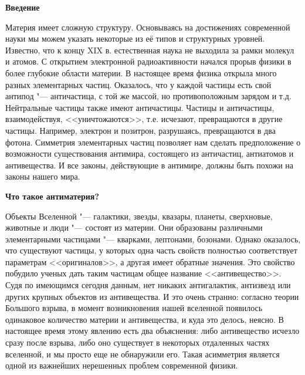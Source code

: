 \begin{flushleft}
    \setlength{\parindent}{14pt}
    \hspace*{10pt}
    \textbf{Введение}
    \vspace*{14pt}

    Материя имеет сложную структуру. Основываясь на достижениях современной науки 
    мы можем указать некоторые из её типов и структурных уровней. Известно, что к концу XIX в. 
    естественная наука не выходила за рамки молекул и атомов. С открытием электронной радиоактивности 
    начался прорыв физики в более глубокие области материи. В настоящее время физика открыла 
    много разных элементарных частиц. Оказалось, что у каждой частицы есть свой антипод "--- античастица,
    с той же массой, но противоположным зарядом и т.д. Нейтральные частицы также имеют 
    античастицы. Частицы и античастицы, взаимодействуя, <<уничтожаются>>, т.е. исчезают, превращаются 
    в другие частицы. Например, электрон и позитрон, разрушаясь, превращаются в два фотона. 
    Симметрия элементарных частиц позволяет нам сделать предположение о возможности существования 
    антимира, состоящего из античастиц, антиатомов и антивещества. И все законы, действующие в антимире,
    должны быть похожи на законы нашего мира. 

    \newpage
    \textbf{Что такое антиматерия?}
    \vspace*{14pt}
    
    Объекты Вселенной "--- галактики, звезды, квазары, планеты, сверхновые, 
    животные и люди "--- состоят из материи. Они образованы различными элементарными 
    частицами "--- кварками, лептонами, бозонами. Однако оказалось, что существуют частицы, 
    у которых одна часть свойств полностью соответствует параметрам <<оригиналов>>, а 
    другая имеет обратные значения. Это свойство побудило ученых дать таким частицам общее название <<антивещество>>. \\

Судя по имеющимся сегодня данным, нет никаких антигалактик, антизвезд или других крупных 
объектов из антивещества. И это очень странно: согласно теории Большого взрыва, в момент 
возникновения нашей вселенной появилось одинаковое количество материи и антивещества, и куда 
это делось, неясно. В настоящее время этому явлению есть два объяснения: либо антивещество исчезло 
сразу после взрыва, либо оно существует в некоторых отдаленных частях вселенной, и мы просто 
еще не обнаружили его. Такая асимметрия является одной из важнейших нерешенных проблем современной физики.\\


\end{flushleft}
